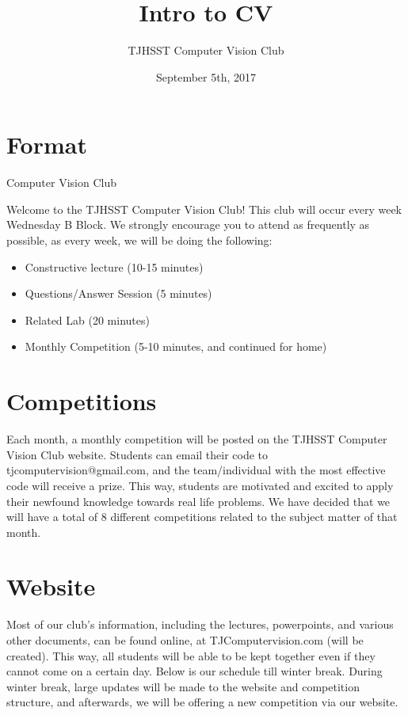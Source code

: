 \documentclass{article}
\title{Intro to CV}
\author{TJHSST Computer Vision Club }
\date{September 5th, 2017}
\begin{document}
\maketitle

\section{Format}
Computer Vision Club

Welcome to the TJHSST Computer Vision Club! This club will occur every week Wednesday B Block. We strongly encourage you to attend as frequently as possible, as every week, we will be doing the following:


\begin{itemize}
  \item Constructive lecture (10-15 minutes)

  \item Questions/Answer Session (5 minutes)
  \item Related Lab (20 minutes)
  \item Monthly Competition (5-10 minutes, and continued for home)


\end{itemize}


\section{Competitions}

Each month, a monthly competition will be posted on the TJHSST Computer Vision  Club website. Students can email their code to tjcomputervision@gmail.com, and the team/individual with the most effective code will receive a prize. This way, students are motivated and excited to apply their newfound knowledge towards real life problems. We have decided that we will have a total of 8 different competitions related to the subject matter of that month.

\section{Website}
Most of our club’s information, including the lectures, powerpoints, and various other documents, can be found online, at TJComputervision.com (will be created). This way, all students will be able to be kept together even if they cannot come on a certain day. Below is our schedule till winter break. During winter break, large updates will be made to the website and competition structure, and afterwards, we will be offering a new competition via our website.
\end{document}
